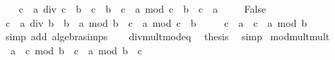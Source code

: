 \begin{isabellebody}
\ \ \isamarkupfalse%
\ {\isachardoublequoteopen}{\isacharparenleft}{\kern0pt}{\isacharparenleft}{\kern0pt}c\ {\isacharasterisk}{\kern0pt}\ a{\isacharparenright}{\kern0pt}\ div\ {\isacharparenleft}{\kern0pt}c\ {\isacharasterisk}{\kern0pt}\ b{\isacharparenright}{\kern0pt}{\isacharparenright}{\kern0pt}\ {\isacharasterisk}{\kern0pt}\ {\isacharparenleft}{\kern0pt}c\ {\isacharasterisk}{\kern0pt}\ b{\isacharparenright}{\kern0pt}\ {\isacharplus}{\kern0pt}\ {\isacharparenleft}{\kern0pt}c\ {\isacharasterisk}{\kern0pt}\ a{\isacharparenright}{\kern0pt}\ mod\ {\isacharparenleft}{\kern0pt}c\ {\isacharasterisk}{\kern0pt}\ b{\isacharparenright}{\kern0pt}\ {\isacharequal}{\kern0pt}\ c\ {\isacharasterisk}{\kern0pt}\ a{\isachardoublequoteclose}\ \isacommand{{\isachardot}{\kern0pt}}\isamarkupfalse%
\isanewline
\ \ \isamarkupfalse%
\ False\ \isamarkupfalse%
\ {\isachardoublequoteopen}c\ {\isacharasterisk}{\kern0pt}\ {\isacharparenleft}{\kern0pt}{\isacharparenleft}{\kern0pt}a\ div\ b{\isacharparenright}{\kern0pt}\ {\isacharasterisk}{\kern0pt}\ b\ {\isacharplus}{\kern0pt}\ a\ mod\ b{\isacharparenright}{\kern0pt}\ {\isacharplus}{\kern0pt}\ {\isacharparenleft}{\kern0pt}c\ {\isacharasterisk}{\kern0pt}\ a{\isacharparenright}{\kern0pt}\ mod\ {\isacharparenleft}{\kern0pt}c\ {\isacharasterisk}{\kern0pt}\ b{\isacharparenright}{\kern0pt}\isanewline
\ \ \ \ {\isacharequal}{\kern0pt}\ c\ {\isacharasterisk}{\kern0pt}\ a\ {\isacharplus}{\kern0pt}\ c\ {\isacharasterisk}{\kern0pt}\ {\isacharparenleft}{\kern0pt}a\ mod\ b{\isacharparenright}{\kern0pt}{\isachardoublequoteclose}\ \isamarkupfalse%
\ {\isacharparenleft}{\kern0pt}simp\ add{\isacharcolon}{\kern0pt}\ algebra{\isacharunderscore}{\kern0pt}simps{\isacharparenright}{\kern0pt}\isanewline
\ \ \isamarkupfalse%
\ div{\isacharunderscore}{\kern0pt}mult{\isacharunderscore}{\kern0pt}mod{\isacharunderscore}{\kern0pt}eq\ \isamarkupfalse%
\ {\isacharquery}{\kern0pt}thesis\ \isamarkupfalse%
\ simp\isanewline
{}\isamarkupfalse%
%
\endisatagproof
{\isafoldproof}%
%
\isadelimproof
\isanewline
%
\endisadelimproof
\isanewline
{}\isamarkupfalse%
\ mod{\isacharunderscore}{\kern0pt}mult{\isacharunderscore}{\kern0pt}mult{}{\isacharcolon}{\kern0pt}\isanewline
\ \ {\isachardoublequoteopen}{\isacharparenleft}{\kern0pt}a\ {\isacharasterisk}{\kern0pt}\ c{\isacharparenright}{\kern0pt}\ mod\ {\isacharparenleft}{\kern0pt}b\ {\isacharasterisk}{\kern0pt}\ c{\isacharparenright}{\kern0pt}\ {\isacharequal}{\kern0pt}\ {\isacharparenleft}{\kern0pt}a\ mod\ b{\isacharparenright}{\kern0pt}\ {\isacharasterisk}{\kern0pt}\ c{\isachardoublequoteclose}\isanewline

\end{isabellebody}
